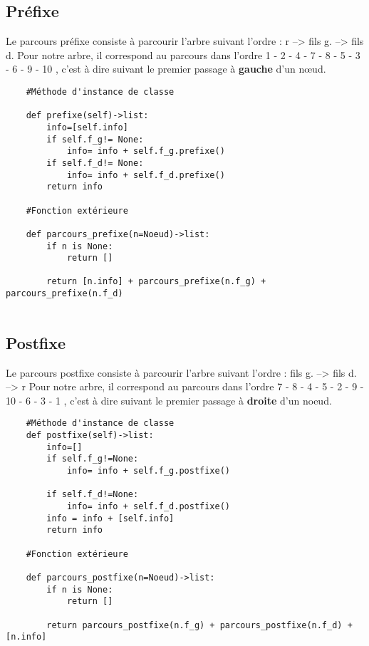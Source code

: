 \documentclass{article}
\begin{document}
\subsection{Préfixe}
Le parcours préfixe consiste à parcourir l'arbre suivant l'ordre : r --> fils g. --> fils d.
 Pour notre arbre, il correspond au parcours dans 
 l’ordre 1 - 2 - 4 - 7 - 8 - 5 - 3 - 6 - 9 - 10 , 
 c’est à dire suivant le premier passage à \textbf{gauche} d’un nœud.
\renewcommand{\theFancyVerbLine}{
  \sffamily\textcolor[rgb]{0.5,0.5,0.5}{\scriptsize\arabic{FancyVerbLine}}}

\begin{verbatim}
    #Méthode d'instance de classe

    def prefixe(self)->list:
        info=[self.info]
        if self.f_g!= None:
            info= info + self.f_g.prefixe()
        if self.f_d!= None:
            info= info + self.f_d.prefixe() 
        return info

    #Fonction extérieure

    def parcours_prefixe(n=Noeud)->list:
        if n is None:
            return []
        
        return [n.info] + parcours_prefixe(n.f_g) + parcours_prefixe(n.f_d)


\end{verbatim}
\subsection{Postfixe}
Le parcours postfixe consiste à parcourir l'arbre suivant l'ordre : fils g. --> fils d. --> r
 Pour notre arbre, il correspond au parcours dans 
 l’ordre 7 - 8 - 4 - 5 - 2 - 9 - 10 - 6 - 3 - 1 ,
 c'est à dire suivant le premier passage à \textbf{droite} d'un noeud.

\renewcommand{\theFancyVerbLine}{
  \sffamily\textcolor[rgb]{0.5,0.5,0.5}{\scriptsize\arabic{FancyVerbLine}}}

\begin{verbatim}
    #Méthode d'instance de classe
    def postfixe(self)->list:
        info=[]
        if self.f_g!=None:
            info= info + self.f_g.postfixe()  
            
        if self.f_d!=None:
            info= info + self.f_d.postfixe()
        info = info + [self.info]
        return info

    #Fonction extérieure

    def parcours_postfixe(n=Noeud)->list:
        if n is None:
            return []
        
        return parcours_postfixe(n.f_g) + parcours_postfixe(n.f_d) + [n.info]
\end{verbatim}
\newpage
\end{document}
